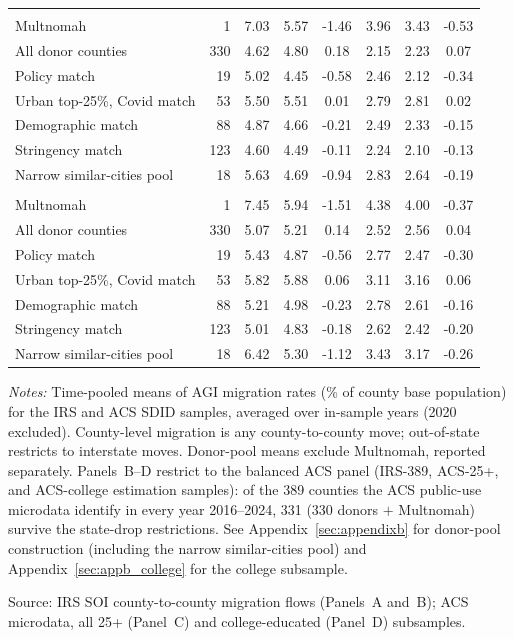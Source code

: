 \begin{table}[htbp]
\begin{threeparttable}
\begin{tabular}{l r c c c c c c}
\midrule
\addlinespace[0.4em]
\multicolumn{8}{l}{\textit{Panel C: ACS, all 25+ (2018-2024, excl.\ 2020)}} \\
\addlinespace
Multnomah & 1 & 7.03 & 5.57 & -1.46 & 3.96 & 3.43 & -0.53 \\
\addlinespace
All donor counties & 330 & 4.62 & 4.80 & 0.18 & 2.15 & 2.23 & 0.07 \\
Policy match & 19 & 5.02 & 4.45 & -0.58 & 2.46 & 2.12 & -0.34 \\
Urban top-25\%, Covid match & 53 & 5.50 & 5.51 & 0.01 & 2.79 & 2.81 & 0.02 \\
Demographic match & 88 & 4.87 & 4.66 & -0.21 & 2.49 & 2.33 & -0.15 \\
Stringency match & 123 & 4.60 & 4.49 & -0.11 & 2.24 & 2.10 & -0.13 \\
Narrow similar-cities pool & 18 & 5.63 & 4.69 & -0.94 & 2.83 & 2.64 & -0.19 \\
\midrule
\addlinespace[0.4em]
\multicolumn{8}{l}{\textit{Panel D: ACS, college-educated (2018-2024, excl.\ 2020)}} \\
\addlinespace
Multnomah & 1 & 7.45 & 5.94 & -1.51 & 4.38 & 4.00 & -0.37 \\
\addlinespace
All donor counties & 330 & 5.07 & 5.21 & 0.14 & 2.52 & 2.56 & 0.04 \\
Policy match & 19 & 5.43 & 4.87 & -0.56 & 2.77 & 2.47 & -0.30 \\
Urban top-25\%, Covid match & 53 & 5.82 & 5.88 & 0.06 & 3.11 & 3.16 & 0.06 \\
Demographic match & 88 & 5.21 & 4.98 & -0.23 & 2.78 & 2.61 & -0.16 \\
Stringency match & 123 & 5.01 & 4.83 & -0.18 & 2.62 & 2.42 & -0.20 \\
Narrow similar-cities pool & 18 & 6.42 & 5.30 & -1.12 & 3.43 & 3.17 & -0.26 \\
\bottomrule
\end{tabular}
\begin{tablenotes}[flushleft]
\footnotesize
\item \textit{Notes:} Time-pooled means of AGI migration rates (\% of county base population) for the IRS and ACS SDID samples, averaged over in-sample years (2020 excluded). County-level migration is any county-to-county move; out-of-state restricts to interstate moves. Donor-pool means exclude Multnomah, reported separately. Panels~B--D restrict to the balanced ACS panel (IRS-389, ACS-25+, and ACS-college estimation samples): of the 389 counties the ACS public-use microdata identify in every year 2016--2024, 331 (330 donors $+$ Multnomah) survive the state-drop restrictions. See Appendix~\ref{sec:appendixb} for donor-pool construction (including the narrow similar-cities pool) and Appendix~\ref{sec:appb_college} for the college subsample.
\item Source: IRS SOI county-to-county migration flows (Panels~A and~B); ACS microdata, all 25+ (Panel~C) and college-educated (Panel~D) subsamples.
\end{tablenotes}
\end{threeparttable}
\end{table}
